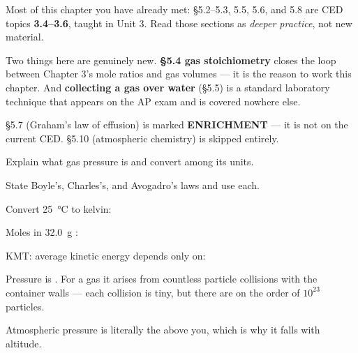 \documentclass{apchem-notes}
\begin{document}
\apctitleblock

\begin{apcnote}
Most of this chapter you have already met: \S5.2--5.3, 5.5, 5.6, and
5.8 are CED topics \textbf{3.4--3.6}, taught in Unit 3. Read those sections
as \emph{deeper practice}, not new material.

Two things here are genuinely new. \textbf{\S5.4 gas stoichiometry} closes
the loop between Chapter 3's mole ratios and gas volumes --- it is the
reason to work this chapter. And \textbf{collecting a gas over water}
(\S5.5) is a standard laboratory technique that appears on the AP exam and
is covered nowhere else.

\S5.7 (Graham's law of effusion) is marked \textbf{ENRICHMENT} --- it is not
on the current CED. \S5.10 (atmospheric chemistry) is skipped entirely.
\end{apcnote}


\begin{objectives}
  \item Explain what gas pressure is and convert among its units.
  \item State Boyle's, Charles's, and Avogadro's laws and use each.
\end{objectives}


\begin{warmup}[3]
  \item Convert \SI{25}{\celsius} to kelvin: 
  \item Moles in \SI{32.0}{\gram} : 
  \item KMT: average kinetic energy depends only on:
\end{warmup}



Pressure is . For a gas it arises
from countless particle collisions with the container walls --- each
collision is tiny, but there are on the order of $10^{23}$ particles.

Atmospheric pressure is literally the  above you, which is why it falls with altitude.
\end{document}
